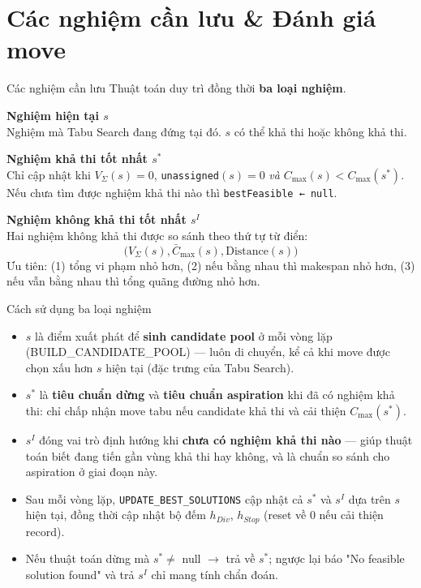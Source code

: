\documentclass[aspectratio=169]{beamer}
\newcommand{\hl}[1]{\textcolor{blue!60!black}{\textbf{#1}}}
\begin{document}
\section{Các nghiệm cần lưu \& Đánh giá move}

\begin{frame}{ Các nghiệm cần lưu}
  \small Thuật toán duy trì đồng thời \hl{ba loại nghiệm}.

  \vspace{2mm}
  \textbf{ Nghiệm hiện tại $s$}\\
  \small Nghiệm mà Tabu Search đang đứng tại đó. $s$ có thể khả thi hoặc không khả thi.

  \vspace{2mm}
  \textbf{ Nghiệm khả thi tốt nhất $s^*$}\\
  \small Chỉ cập nhật khi $V_\Sigma(s) = 0$, \texttt{unassigned}$(s)=0$ \emph{và} $C_{\max}(s) < C_{\max}(s^*)$. Nếu chưa tìm được nghiệm khả thi nào thì \texttt{bestFeasible ← null}.

  \vspace{2mm}
  \textbf{ Nghiệm không khả thi tốt nhất $s^I$}\\
  \small Hai nghiệm không khả thi được so sánh theo thứ tự từ điển:
  $$\big(V_\Sigma(s), \bar{C}_{\max}(s), \text{Distance}(s)\big)$$
  \small Ưu tiên: (1) tổng vi phạm nhỏ hơn, (2) nếu bằng nhau thì makespan nhỏ hơn, (3) nếu vẫn bằng nhau thì tổng quãng đường nhỏ hơn.
\end{frame}

\begin{frame}{Cách sử dụng ba loại nghiệm}
  \begin{itemize}
    \item $s$ là điểm xuất phát để \hl{sinh candidate pool} ở mỗi vòng lặp (BUILD\_CANDIDATE\_POOL) — luôn di chuyển, kể cả khi move được chọn xấu hơn $s$ hiện tại (đặc trưng của Tabu Search).
    \item $s^*$ là \hl{tiêu chuẩn dừng} và \hl{tiêu chuẩn aspiration} khi đã có nghiệm khả thi: chỉ chấp nhận move tabu nếu candidate khả thi và cải thiện $C_{\max}(s^*)$.
    \item $s^I$ đóng vai trò định hướng khi \hl{chưa có nghiệm khả thi nào} — giúp thuật toán biết đang tiến gần vùng khả thi hay không, và là chuẩn so sánh cho aspiration ở giai đoạn này.
    \item Sau mỗi vòng lặp, \texttt{UPDATE\_BEST\_SOLUTIONS} cập nhật cả $s^*$ và $s^I$ dựa trên $s$ hiện tại, đồng thời cập nhật bộ đếm $h_{Div}$, $h_{Stop}$ (reset về 0 nếu cải thiện record).
    \item Nếu thuật toán dừng mà $s^* \ne$ null $\to$ trả về $s^*$; ngược lại báo "No feasible solution found" và trả $s^I$ chỉ mang tính chẩn đoán.
  \end{itemize}
\end{frame}
\end{document}
